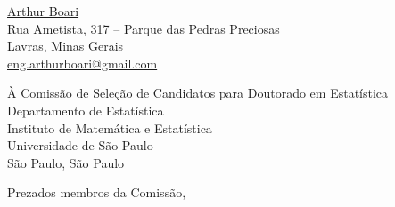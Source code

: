 \documentclass[12pt,a4paper]{article}
\begin{document}
	
	\begin{flushright}
		\href{http://lattes.cnpq.br/7113151378838886}{Arthur Boari}\\
		Rua Ametista, 317 – Parque das Pedras Preciosas\\
		Lavras, Minas Gerais\\
		\href{mailto:eng.arthurboari@gmail.com}{eng.arthurboari@gmail.com}
	\end{flushright}


	\begin{flushleft}
		À Comissão de Seleção de Candidatos para Doutorado em Estatística\\
		Departamento de Estatística\\
		Instituto de Matemática e Estatística\\
		Universidade de São Paulo\\
		São Paulo, São Paulo
	\end{flushleft}

	Prezados membros da Comissão, \\
	
	
	
	
\end{document}
